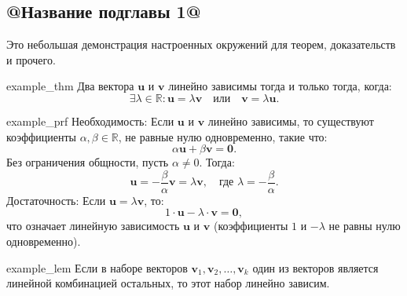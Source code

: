 \subsection{@Название подглавы 1@}

Это небольшая демонстрация настроенных окружений для теорем, доказательств и прочего.

\begin{thm}{example_thm}
Два вектора $\mathbf{u}$ и $\mathbf{v}$ линейно зависимы тогда и только тогда, когда:
\begin{equation*}
    \exists \lambda \in \mathbb{R} \colon \mathbf{u} = \lambda \mathbf{v} \quad \text{или} \quad \mathbf{v} = \lambda \mathbf{u}.
\end{equation*}

\end{thm}

\begin{prf}[]{example_prf}
Необходимость: Если \( \mathbf{u} \) и \( \mathbf{v} \) линейно зависимы, то существуют коэффициенты $\alpha, \beta \in \mathbb{R}$, не равные нулю одновременно, такие что:
\begin{equation*}
    \alpha \mathbf{u} + \beta \mathbf{v} = \mathbf{0}.
\end{equation*}
Без ограничения общности, пусть \( \alpha \neq 0 \). Тогда:
\begin{equation*}
    \mathbf{u} = -\frac{\beta}{\alpha} \mathbf{v} = \lambda \mathbf{v}, \quad \text{где } \lambda = -\frac{\beta}{\alpha}.
\end{equation*}
Достаточность: Если $\mathbf{u} = \lambda \mathbf{v} $, то:
\begin{equation*}
    1 \cdot \mathbf{u} - \lambda \cdot \mathbf{v} = \mathbf{0},
\end{equation*}
что означает линейную зависимость $\mathbf{u}$ и $\mathbf{v}$ (коэффициенты $1$ и $-\lambda$ не равны нулю одновременно).
\end{prf}

\begin{lem}{example_lem}
    Если в наборе векторов $\mathbf{v}_1, \mathbf{v}_2, \dots, \mathbf{v}_k$ один из векторов является линейной комбинацией остальных, то этот набор линейно зависим.
\end{lem}

